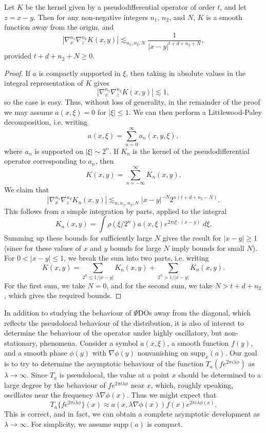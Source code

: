 \begin{theorem}
    Let $K$ be the kernel given by a pseudodifferential operator of order $t$, and let $z = x - y$. Then for any non-negative integers $n_1$, $n_2$, and $N$, $K$ is a smooth function away from the origin, and
    \[ |\nabla^{n_1}_x \nabla^{n_2}_z K(x,y)| \lesssim_{n_1,n_2,N} \frac{1}{|x - y|^{t + d + n_2 + N}}, \]
    provided $t + d + n_2 + N \geq 0$.
\end{theorem}
\begin{proof}
    If $a$ is compactly supported in $\xi$, then taking in absolute values in the integral representation of $K$ gives
    \[ |\nabla^{n_1}_x \nabla^{n_2}_z K(x,y)| \lesssim 1, \]
    so the case is easy. Thus, without loss of generality, in the remainder of the proof we may assume $a(x,\xi) = 0$ for $|\xi| \leq 1$. We can then perform a Littlewood-Paley decomposition, i.e. writing
    \[ a(x,\xi) = \sum_{n = 0}^\infty a_n(x,y,\xi), \]
    where $a_n$ is supported on $|\xi| \sim 2^n$. If $K_n$ is the kernel of the pseudodifferential operator corresponding to $a_n$, then
    \[ K(x,y) = \sum_{n = -\infty}^\infty K_n(x,y). \]
    We claim that
    \[ |\nabla^{n_1}_x \nabla^{n_2}_z K_n(x,y)| \lesssim_{n,n_1,n_2,N} |x - y|^{-N} 2^{n(t + d + n_2 - N)}. \]
    This follows from a simple integration by parts, applied to the integral
    \[ K_n(x,y) = \int \rho(\xi / 2^n) a(x,\xi) e^{2 \pi i \xi \cdot (x - y)}\; d\xi. \]
    Summing up these bounds for sufficiently large $N$ gives the result for $|x - y| \geq 1$ (since for these values of $x$ and $y$ bounds for large $N$ imply bounds for small $N$). For $0 < |x - y| \leq 1$, we break the sum into two parts, i.e. writing
    \[ K(x,y) = \sum_{2^n \leq 1/|x-y|} K_n(x,y) + \sum_{2^n > 1/|x-y|} K_n(x,y). \]
    For the first sum, we take $N = 0$, and for the second sum, we take $N > t + d + n_2$, which gives the required bounds.
\end{proof}

In addition to studying the behaviour of $\Psi$DOs away from the diagonal, which reflects the pseudolocal behaviour of the distribution, it is also of interest to determine the behaviour of the operator under highly oscillatory, but non-stationary, phenomena. Consider a symbol $a(x,\xi)$, a smooth function $f(y)$, and a smooth phase $\phi(y)$ with $\nabla \phi(y)$ nonvanishing on $\text{supp}_x(a)$. Our goal is to try to determine the asymptotic behaviour of the function $T_a(f e^{2 \pi i \lambda \phi})$ as $\lambda \to \infty$. Since $T_a$ is pseudolocal, the value at a point $x$ should be determined to a large degree by the behaviour of $f e^{2 \pi i \lambda \phi}$ near $x$, which, roughly speaking, oscillates near the frequency $\lambda \nabla \phi(x)$. Thus we might expect that
%
\[ T_a \{ f e^{2 \pi i \lambda \phi} \} (x) \approx a(x,\lambda \nabla \phi(x)) f(x) e^{2 \pi i \lambda \phi(x)}. \]
%
This is correct, and in fact, we can obtain a complete asymptotic development as $\lambda \to \infty$. For simplicity, we assume $\text{supp}(a)$ is compact.


